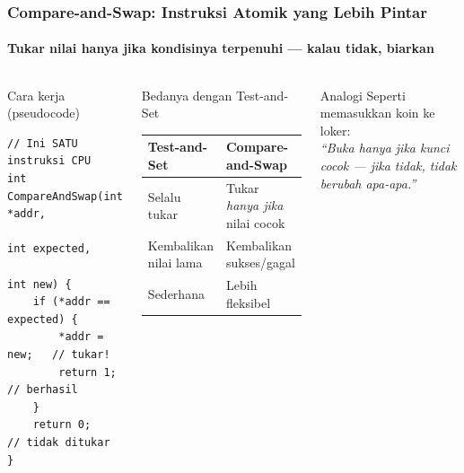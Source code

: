 \documentclass[t,aspectratio=169,xcolor=dvipsnames]{beamer}
\begin{document}
\begin{frame}[fragile,shrink=10]
    \frametitle{Compare-and-Swap: Instruksi Atomik yang Lebih Pintar}
    \framesubtitle{Tukar nilai hanya jika kondisinya terpenuhi — kalau tidak, biarkan}
    \small

    \begin{columns}[T]
        \begin{block}{Cara kerja (pseudocode)}
\begin{lstlisting}[basicstyle=\ttfamily\scriptsize]
// Ini SATU instruksi CPU
int CompareAndSwap(int *addr,
                  int expected,
                  int new) {
    if (*addr == expected) {
        *addr = new;   // tukar!
        return 1;      // berhasil
    }
    return 0;          // tidak ditukar
}
\end{lstlisting}
        \end{block}

        \begin{block}{Bedanya dengan Test-and-Set}
            \begin{tabular}{p{} p{}}
                \textbf{Test-and-Set} & \textbf{Compare-and-Swap} \\
                \hline
                Selalu tukar & Tukar \textit{hanya jika} nilai cocok \\
                Kembalikan nilai lama & Kembalikan sukses/gagal \\
                Sederhana & Lebih fleksibel \\
            \end{tabular}
        \end{block}

        \begin{exampleblock}{Analogi}
            Seperti memasukkan koin ke loker:\\
            \textit{``Buka hanya jika kunci cocok — jika tidak, tidak berubah apa-apa.''}
        \end{exampleblock}
    \end{columns}

\end{frame}
\end{document}
